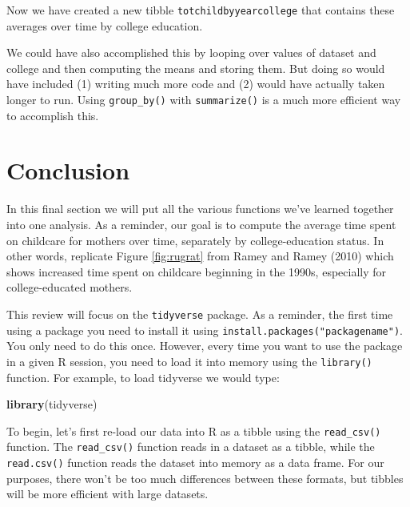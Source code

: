 \documentclass[
]{book}
\newenvironment{Shaded}{\begin{snugshade}}{\end{snugshade}}
\newcommand{\FunctionTok}[1]{\textcolor[rgb]{0.13,0.29,0.53}{\textbf{#1}}}
\newcommand{\NormalTok}[1]{#1}
\begin{document}
Now we have created a new tibble \texttt{totchildbyyearcollege} that contains these averages over time by college education.

We could have also accomplished this by looping over values of dataset and college and then computing the means and storing them. But doing so would have included (1) writing much more code and (2) would have actually taken longer to run. Using \texttt{group\_by()} with \texttt{summarize()} is a much more efficient way to accomplish this.

\section{Conclusion}\label{conclusion-5}

In this final section we will put all the various functions we've learned together into one analysis. As a reminder, our goal is to compute the average time spent on childcare for mothers over time, separately by college-education status. In other words, replicate Figure \ref{fig:rugrat} from Ramey and Ramey (2010) which shows increased time spent on childcare beginning in the 1990s, especially for college-educated mothers.

This review will focus on the \texttt{tidyverse} package. As a reminder, the first time using a package you need to install it using \texttt{install.packages("packagename")}. You only need to do this once. However, every time you want to use the package in a given R session, you need to load it into memory using the \texttt{library()} function. For example, to load tidyverse we would type:

\begin{Shaded}
\begin{Highlighting}[]
\FunctionTok{library}\NormalTok{(tidyverse)}
\end{Highlighting}
\end{Shaded}

To begin, let's first re-load our data into R as a tibble using the \texttt{read\_csv()} function. The \texttt{read\_csv()} function reads in a dataset as a tibble, while the \texttt{read.csv()} function reads the dataset into memory as a data frame. For our purposes, there won't be too much differences between these formats, but tibbles will be more efficient with large datasets.
\end{document}
